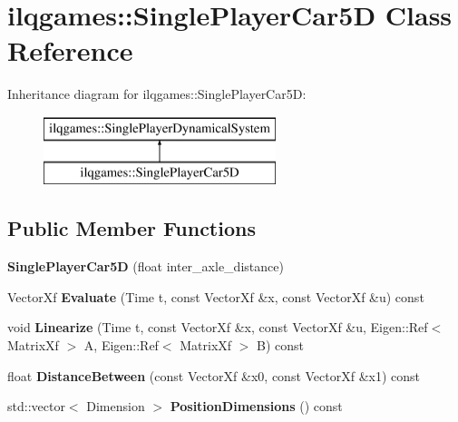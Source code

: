 \hypertarget{classilqgames_1_1_single_player_car5_d}{}\section{ilqgames\+:\+:Single\+Player\+Car5D Class Reference}
\label{classilqgames_1_1_single_player_car5_d}
Inheritance diagram for ilqgames\+:\+:Single\+Player\+Car5D\+:\begin{figure}[H]
\begin{center}
\leavevmode
\includegraphics[height=2.000000cm]{classilqgames_1_1_single_player_car5_d}
\end{center}
\end{figure}
\subsection*{Public Member Functions}
\begin{DoxyCompactItemize}
\item 
{\bfseries Single\+Player\+Car5D} (float inter\+\_\+axle\+\_\+distance)\hypertarget{classilqgames_1_1_single_player_car5_d_aa2d4167f0643ec567c9b972027ef4097}{}\label{classilqgames_1_1_single_player_car5_d_aa2d4167f0643ec567c9b972027ef4097}

\item 
Vector\+Xf {\bfseries Evaluate} (Time t, const Vector\+Xf \&x, const Vector\+Xf \&u) const \hypertarget{classilqgames_1_1_single_player_car5_d_aec8946c18a72299e3b6fd01cb7eda35b}{}\label{classilqgames_1_1_single_player_car5_d_aec8946c18a72299e3b6fd01cb7eda35b}

\item 
void {\bfseries Linearize} (Time t, const Vector\+Xf \&x, const Vector\+Xf \&u, Eigen\+::\+Ref$<$ Matrix\+Xf $>$ A, Eigen\+::\+Ref$<$ Matrix\+Xf $>$ B) const \hypertarget{classilqgames_1_1_single_player_car5_d_a8ad32f94582556054d6e12ce38fbce43}{}\label{classilqgames_1_1_single_player_car5_d_a8ad32f94582556054d6e12ce38fbce43}

\item 
float {\bfseries Distance\+Between} (const Vector\+Xf \&x0, const Vector\+Xf \&x1) const \hypertarget{classilqgames_1_1_single_player_car5_d_a1926a9e26bbca135158bf6e2f30c0fff}{}\label{classilqgames_1_1_single_player_car5_d_a1926a9e26bbca135158bf6e2f30c0fff}

\item 
std\+::vector$<$ Dimension $>$ {\bfseries Position\+Dimensions} () const \hypertarget{classilqgames_1_1_single_player_car5_d_aeb5fabf794950ec8e55e37d685c20027}{}\label{classilqgames_1_1_single_player_car5_d_aeb5fabf794950ec8e55e37d685c20027}

\end{DoxyCompactItemize}
